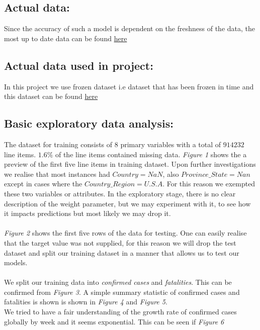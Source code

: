 \documentclass{article}
\begin{document}
\subsection{Actual data:}
Since the accuracy of such a model is dependent on the freshness of the data, the most up to date data can be found \href{https://www.kaggle.com/c/covid19-global-forecasting-week-5/overview}{here}

\subsection{Actual data used in project:}
In this project we use frozen dataset i.e dataset that has been frozen in time and this dataset can be found \href{https://github.com/acquayefrank/MLDM2020-Project/tree/master/data}{here}

\subsection{Basic exploratory data analysis:}
The dataset for training consists of $8$ primary variables with a total of $914232$ line items. $1.6\%$  of the line items contained missing data. \emph{Figure 1} shows the a preview of the first five line items in training dataset.  Upon further investigations we realise that most instances had $Country = NaN$, also $Province\_State = Nan$ except in cases where the $Country\_Region = U.S.A$. For this reason we exempted these two variables or attributes. In the exploratory stage, there is no clear description of the weight parameter, but we may experiment with it, to see how it impacts predictions but most likely we may drop it. 
\\
\\
 \emph{Figure 2} shows the first five rows of the data for testing. One can easily realise that the target value was not supplied, for this reason we will drop the test dataset and split our training dataset in a manner that allows us to test our models.
 \\
 \\
 We split our training data into \emph{confirmed cases} and  \emph{fatalities}. This can be confirmed from  \emph{Figure 3}. 
 A simple summary statistic of confirmed cases and fatalities is shown is shown in \emph{Figure 4} and \emph{Figure 5}.
 \\
 We tried to have a fair understanding of the growth rate of confirmed cases globally by week and it seems exponential. This can be seen if   \emph{Figure 6}
 
\end{document}
